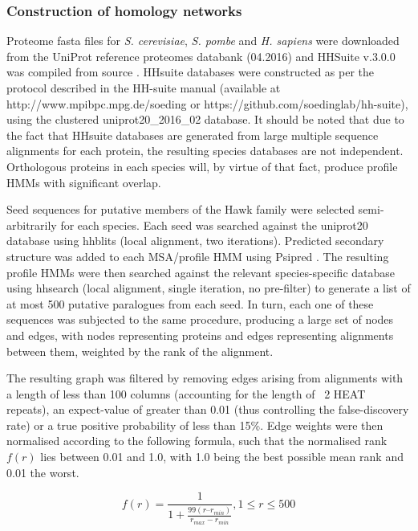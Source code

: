 \documentclass[a4paper,11pt,twoside,openright]{scrbook}
\begin{document}
\subsubsection{Construction of homology networks}
Proteome fasta files for \textit{S. cerevisiae}, \textit{S. pombe} and \textit{H. sapiens} were downloaded from the UniProt reference proteomes databank \cite{Consortium2017} (04.2016) and HHSuite v.3.0.0 was compiled from source \cite{Soding2005,Remmert2011}. HHsuite databases were constructed as per the protocol described in the HH-suite manual (available at http://www.mpibpc.mpg.de/soeding or https://github.com/soedinglab/hh-suite), using the clustered uniprot20\_2016\_02 database. It should be noted that due to the fact that HHsuite databases are generated from large multiple sequence alignments for each protein, the resulting species databases are not independent. Orthologous proteins in each species will, by virtue of that fact, produce profile HMMs with significant overlap.

Seed sequences for putative members of the Hawk family were selected semi-arbitrarily for each species. Each seed was searched against the uniprot20 database using hhblits \cite{Remmert2011} (local alignment, two iterations). Predicted secondary structure was added to each MSA/profile HMM using Psipred \cite{Jones1999}. The resulting profile HMMs were then searched against the relevant species-specific database using hhsearch (local alignment, single iteration, no pre-filter) to generate a list of at most 500 putative paralogues from each seed. In turn, each one of these sequences was subjected to the same procedure, producing a large set of nodes and edges, with nodes representing proteins and edges representing alignments between them, weighted by the rank of the alignment.

The resulting graph was filtered by removing edges arising from alignments with a length of less than 100 columns (accounting for the length of ~2 HEAT repeats), an expect-value of greater than 0.01 (thus controlling the false-discovery rate) or a true positive probability of less than 15\%. Edge weights were then normalised according to the following formula, such that the normalised rank $f(r)$ lies between 0.01 and 1.0, with 1.0 being the best possible mean rank and 0.01 the worst.

\begin{displaymath}
    f(r) = \frac{1}{1 + \frac{99(r – r_{min} )}{r_{max} - r_{min}}}, 1 \leq r \leq 500
\end{displaymath}
\end{document}
